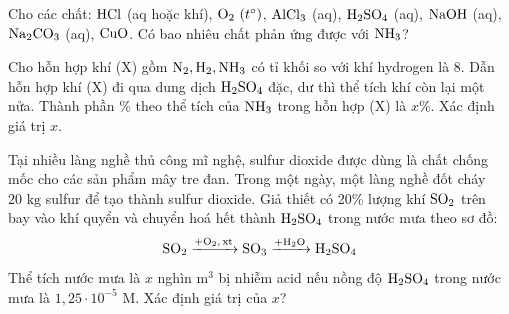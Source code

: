 \documentclass[12pt,a4paper]{article}
\begin{document}
\begin{ex}
Cho các chất: $\ce{HCl}$ (aq hoặc khí), $\ce{O2}\ (t^\circ)$, $\ce{AlCl3}$ (aq), $\ce{H2SO4}$ (aq), $\ce{NaOH}$ (aq), $\ce{Na2CO3}$ (aq), $\ce{CuO}$. Có bao nhiêu chất phản ứng được với $\ce{NH3}$?

\end{ex}

\begin{ex}
Cho hỗn hợp khí (X) gồm $\ce{N2, H2, NH3}$ có tỉ khối so với khí hydrogen là 8. Dẫn hỗn hợp khí (X) đi qua dung dịch $\ce{H2SO4}$ đặc, dư thì thể tích khí còn lại một nửa. Thành phần \% theo thể tích của $\ce{NH3}$ trong hỗn hợp (X) là $x\%$. Xác định giá trị $x$.

\end{ex}

\begin{ex}
Tại nhiều làng nghề thủ công mĩ nghệ, sulfur dioxide được dùng là chất chống mốc cho các sản phẩm mây tre đan. Trong một ngày, một làng nghề đốt cháy $20\text{ kg}$ sulfur để tạo thành sulfur dioxide. Giả thiết có 20\% lượng khí $\ce{SO2}$ trên bay vào khí quyển và chuyển hoá hết thành $\ce{H2SO4}$ trong nước mưa theo sơ đồ:
\[\ce{SO2 ->[+O2, xt] SO3 ->[+H2O] H2SO4}\]
Thể tích nước mưa là $x$ nghìn $\text{m}^3$ bị nhiễm acid nếu nồng độ $\ce{H2SO4}$ trong nước mưa là $1{,}25 \cdot 10^{-5}\text{ M}$. Xác định giá trị của $x$?

\end{ex}
\end{document}
